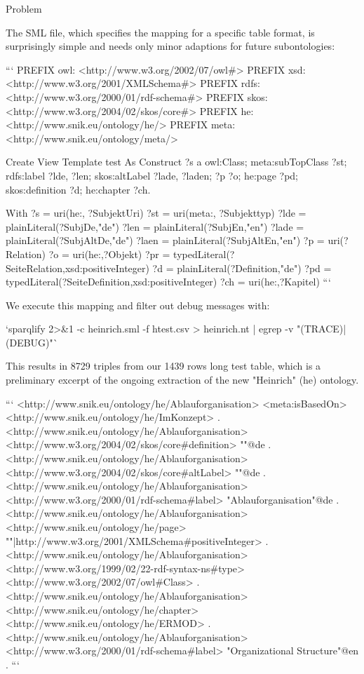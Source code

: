 \documentclass{beamer}
\begin{document}
\begin{frame}{Problem}
\begin{frame}{}
\begin{frame}{}
\begin{frame}{}
The SML file, which specifies the mapping for a specific table format, is surprisingly simple and needs only minor adaptions for future subontologies:

```
PREFIX owl: <http://www.w3.org/2002/07/owl#>
PREFIX xsd: <http://www.w3.org/2001/XMLSchema#>
PREFIX rdfs: <http://www.w3.org/2000/01/rdf-schema#>
PREFIX skos: <http://www.w3.org/2004/02/skos/core#>
PREFIX he: <http://www.snik.eu/ontology/he/>
PREFIX meta: <http://www.snik.eu/ontology/meta/>

Create View Template test As
  Construct {
    ?s  a owl:Class;
        meta:subTopClass ?st;
        rdfs:label ?lde, ?len;
        skos:altLabel ?lade, ?laden;
        ?p ?o;
        he:page ?pd;
        skos:definition ?d;
        he:chapter ?ch.
  }

With
    ?s = uri(he:, ?SubjektUri)
    ?st = uri(meta:, ?Subjekttyp)
    ?lde = plainLiteral(?SubjDe,"de")
    ?len = plainLiteral(?SubjEn,"en")
    ?lade = plainLiteral(?SubjAltDe,"de")
    ?laen = plainLiteral(?SubjAltEn,"en")
    ?p = uri(?Relation)
    ?o = uri(he:,?Objekt)
    ?pr = typedLiteral(?SeiteRelation,xsd:positiveInteger)
    ?d = plainLiteral(?Definition,"de")
    ?pd = typedLiteral(?SeiteDefinition,xsd:positiveInteger)
    ?ch = uri(he:,?Kapitel)
```

We execute this mapping and filter out debug messages with:

`sparqlify 2>&1 -c heinrich.sml -f htest.csv > heinrich.nt  | egrep -v "(TRACE)|(DEBUG)"`

This results in 8729 triples from our 1439 rows long test table, which is a preliminary excerpt of the ongoing extraction of the new "Heinrich" (he) ontology.


```
<http://www.snik.eu/ontology/he/Ablauforganisation> <meta:isBasedOn> <http://www.snik.eu/ontology/he/ImKonzept> .
<http://www.snik.eu/ontology/he/Ablauforganisation> <http://www.w3.org/2004/02/skos/core#definition> ""@de .
<http://www.snik.eu/ontology/he/Ablauforganisation> <http://www.w3.org/2004/02/skos/core#altLabel> ""@de .
<http://www.snik.eu/ontology/he/Ablauforganisation> <http://www.w3.org/2000/01/rdf-schema#label> "Ablauforganisation"@de .                                                                                                                    
<http://www.snik.eu/ontology/he/Ablauforganisation> <http://www.snik.eu/ontology/he/page> ""^^<http://www.w3.org/2001/XMLSchema#positiveInteger> .
<http://www.snik.eu/ontology/he/Ablauforganisation> <http://www.w3.org/1999/02/22-rdf-syntax-ns#type> <http://www.w3.org/2002/07/owl#Class> .
<http://www.snik.eu/ontology/he/Ablauforganisation> <http://www.snik.eu/ontology/he/chapter> <http://www.snik.eu/ontology/he/ERMOD> .
<http://www.snik.eu/ontology/he/Ablauforganisation> <http://www.w3.org/2000/01/rdf-schema#label> "Organizational Structure"@en .
```


\end{frame}
\end{frame}
\end{frame}
\end{frame}
\end{document}
